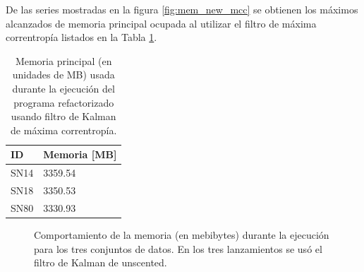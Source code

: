 De las series mostradas en la figura \ref{fig:mem_new_mcc} se obtienen los m\'aximos alcanzados de memoria principal ocupada al utilizar el filtro de m\'axima correntrop\'ia listados en la Tabla \ref{tab:mem4}. 
\bigskip

\begin{table}[h!]
\centering
\caption{Memoria principal (en unidades de MB) usada durante la ejecuci\'on del programa refactorizado usando filtro de Kalman de m\'axima correntrop\'ia.}
\begin{tabular}{|l|l|}
\hline
\textbf{ID} & Memoria [MB]\\\hline\hline
SN14 & 3359.54\\\hline
SN18 & 3350.53\\\hline
SN80 & 3330.93\\\hline
\end{tabular}
\label{tab:mem4}
\end{table}

\begin{figure}[h!]
\centering
{}\hfill
{}\vfill
{}
\caption{Comportamiento de la memoria (en mebibytes) durante la ejecuci\'on para los tres conjuntos de datos. En los tres lanzamientos se us\'o el filtro de Kalman de unscented.}
\label{fig:mem_ukf}
\end{figure}

